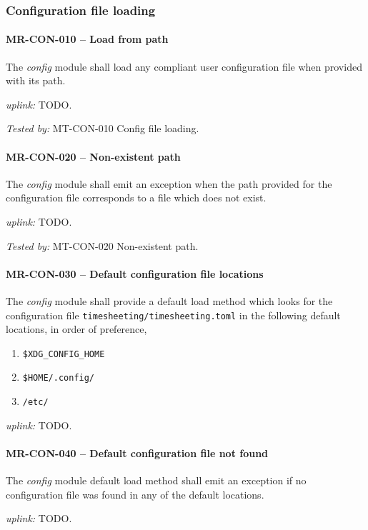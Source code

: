 \subsubsection{Configuration file loading}

\paragraph{MR-CON-010 -- Load from path}
The \emph{config} module shall load any compliant user configuration file when
provided with its path.

\textit{uplink: } TODO.

\textit{Tested by: } MT-CON-010 Config file loading.

\paragraph{MR-CON-020 -- Non-existent path}
The \emph{config} module shall emit an exception when the path provided for the
configuration file corresponds to a file which does not exist.

\textit{uplink: } TODO.

\textit{Tested by: } MT-CON-020 Non-existent path.

\paragraph{MR-CON-030 -- Default configuration file locations}
The \emph{config} module shall provide a default load method which looks
for the configuration file \lstinline{timesheeting/timesheeting.toml}
in the following default locations, in order of preference,
\begin{enumerate}
  \item \lstinline{$XDG_CONFIG_HOME}
  \item \lstinline{$HOME/.config/}
  \item \lstinline{/etc/}
\end{enumerate}

\textit{uplink: } TODO.

\paragraph{MR-CON-040 -- Default configuration file not found}
The \emph{config} module default load method shall emit an exception if
no configuration file was found in any of the default locations.

\textit{uplink: } TODO.

